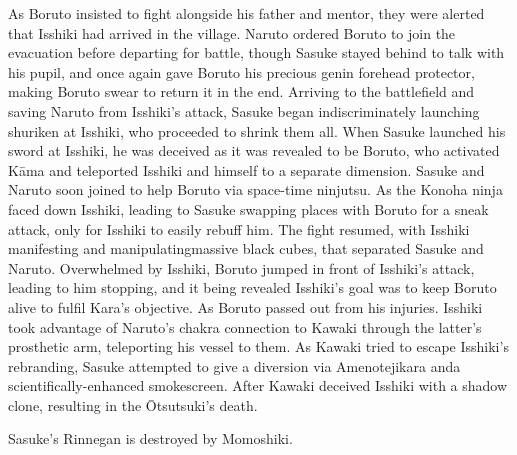 \documentclass[a4paper,12pt]{article}
\begin{document}
As Boruto insisted to fight alongside his father and mentor, they were alerted that Isshiki had arrived in the village. Naruto ordered Boruto to join the evacuation before departing for battle, though Sasuke stayed behind to talk with his pupil, and once again gave Boruto his precious genin forehead protector, making Boruto swear to return it in the end. Arriving to the battlefield and saving Naruto from Isshiki's attack, Sasuke began indiscriminately launching shuriken at Isshiki, who proceeded to shrink them all. When Sasuke launched his sword at Isshiki, he was deceived as it was revealed to be Boruto, who activated Kāma and teleported Isshiki and himself to a separate dimension. Sasuke and Naruto soon joined to help Boruto via space-time ninjutsu. As the Konoha ninja faced down Isshiki, leading to Sasuke swapping places with Boruto for a sneak attack, only for Isshiki to easily rebuff him. The fight resumed, with Isshiki manifesting and manipulatingmassive black cubes, that separated Sasuke and Naruto. Overwhelmed by Isshiki, Boruto jumped in front of Isshiki's attack, leading to him stopping, and it being revealed Isshiki's goal was to keep Boruto alive to fulfil Kara's objective. As Boruto passed out from his injuries. Isshiki took advantage of Naruto's chakra connection to Kawaki through the latter's prosthetic arm, teleporting his vessel to them. As Kawaki tried to escape Isshiki's rebranding, Sasuke attempted to give a diversion via Amenotejikara anda scientifically-enhanced smokescreen. After Kawaki deceived Isshiki with a shadow clone, resulting in the Ōtsutsuki's death.\\ \par \vspace{0.5cm}

Sasuke's Rinnegan is destroyed by Momoshiki.\\ \par \vspace{0.5cm}
\end{document}
